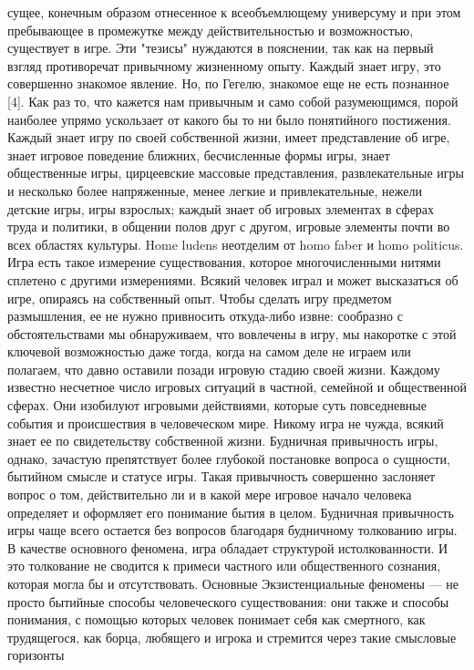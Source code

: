 \documentclass[12pt]{article}
\begin{document}
сущее, конечным образом отнесенное к всеобъемлющему универсуму и при этом пребывающее в промежутке
между действительностью и возможностью, существует в игре. Эти "тезисы" нуждаются в пояснении, так как
на первый взгляд противоречат привычному жизненному опыту. Каждый знает игру, это совершенно знакомое
явление. Но, по Гегелю, знакомое еще не есть познанное [4]. Как раз то, что кажется нам привычным и само
собой разумеющимся, порой наиболее упрямо ускользает от какого бы то ни было понятийного постижения.
Каждый  знает  игру  по  своей  собственной  жизни,  имеет  представление  об  игре,  знает  игровое  поведение
ближних,  бесчисленные  формы  игры,  знает  общественные  игры,  цирцеевские  массовые  представления,
развлекательные игры и несколько более напряженные, менее легкие и привлекательные, нежели детские игры,
игры взрослых; каждый знает об игровых элементах в сферах труда и политики, в общении полов друг с 
другом, игровые элементы почти во всех областях культуры. Home ludens неотделим от homo faber и homo
politicus. Игра есть такое измерение существования, которое многочисленными нитями сплетено с другими
измерениями.  Всякий человек  играл и  может  высказаться  об  игре,  опираясь на собственный опыт. Чтобы
сделать  игру  предметом  размышления,  ее  не  нужно  привносить  откуда-либо  извне:  сообразно  с
обстоятельствами мы обнаруживаем, что вовлечены в игру, мы накоротке с этой ключевой возможностью даже
тогда, когда на самом деле не играем или полагаем, что давно оставили позади игровую стадию своей жизни.
Каждому  известно  несчетное  число  игровых  ситуаций  в  частной,  семейной  и  общественной  сферах.  Они
изобилуют игровыми действиями, которые суть повседневные события и происшествия в человеческом мире.
Никому игра не чужда, всякий знает ее по свидетельству собственной жизни. Будничная привычность игры,
однако, зачастую препятствует более глубокой постановке вопроса о сущности, бытийном смысле и статусе
игры. Такая привычность совершенно заслоняет вопрос о том, действительно ли и в какой мере игровое начало
человека определяет и оформляет его понимание бытия в целом. Будничная привычность игры чаще всего
остается без вопросов благодаря будничному толкованию игры. В качестве основного феномена, игра обладает
структурой истолкованности. И это толкование не сводится к примеси частного или общественного сознания,
которая могла бы и отсутствовать. Основные Экзистенциальные феномены --- не просто бытийные способы
человеческого существования: они также и способы понимания, с помощью которых человек понимает себя как
смертного, как трудящегося, как борца, любящего и игрока и стремится через такие смысловые горизонты
\end{document}
